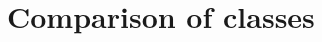 \documentclass[a4paper,11pt]{amsart}
\theoremstyle{plain}
\newtheorem{theorem}{Theorem}[section]
\theoremstyle{definition}
\newtheorem{defi}[theorem]{Definition}
\theoremstyle{remark}
\numberwithin{equation}{section}
\begin{document}

\section{Comparison of classes}\label{sec:comparison}
\end{document}
